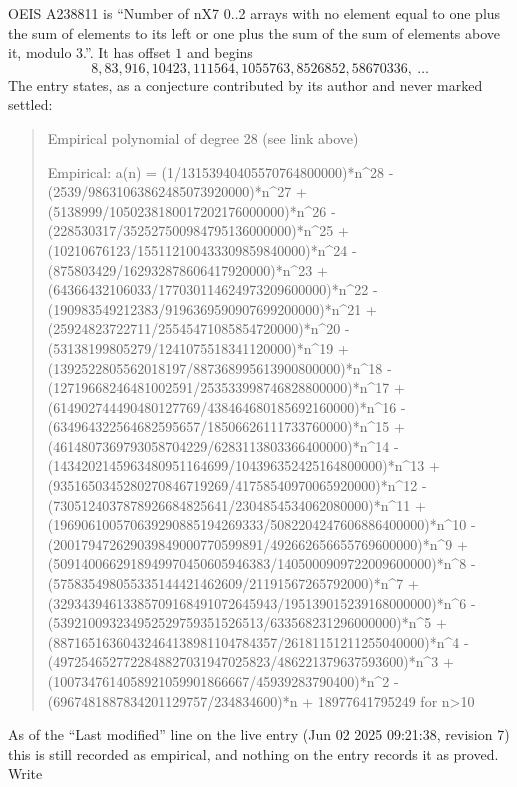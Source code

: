 \documentclass[11pt,a4paper]{article}
\theoremstyle{plain}
\theoremstyle{definition}
\begin{document}
OEIS A238811 is ``Number of nX7 0..2 arrays with no element equal to one plus the sum of elements to its left or one plus the sum of the sum of elements above it, modulo 3.''. It has offset $1$ and begins
\[
8, 83, 916, 10423, 111564, 1055763, 8526852, 58670336,\ \dots
\]
The entry states, as a conjecture contributed by its author and never marked settled:
\begin{quote}
Empirical polynomial of degree 28 (see link above)

Empirical: a(n) = (1/13153940405570764800000)*n\^{}28 - (2539/98631063862485073920000)*n\^{}27 + (5138999/1050238180017202176000000)*n\^{}26 - (228530317/352527500984795136000000)*n\^{}25 + (10210676123/155112100433309859840000)*n\^{}24 - (875803429/162932878606417920000)*n\^{}23 + (64366432106033/177030114624973209600000)*n\^{}22 - (190983549212383/9196369590907699200000)*n\^{}21 + (25924823722711/25545471085854720000)*n\^{}20 - (53138199805279/1241075518341120000)*n\^{}19 + (1392522805562018197/887368995613900800000)*n\^{}18 - (12719668246481002591/253533998746828800000)*n\^{}17 + (614902744490480127769/438464680185692160000)*n\^{}16 - (634964322564682595657/18506626111733760000)*n\^{}15 + (4614807369793058704229/6283113803366400000)*n\^{}14 - (1434202145963480951164699/104396352425164800000)*n\^{}13 + (9351650345280270846719269/41758540970065920000)*n\^{}12 - (7305124037878926684825641/2304854534062080000)*n\^{}11 + (196906100570639290885194269333/5082204247606886400000)*n\^{}10 - (200179472629039849000770599891/492662656655769600000)*n\^{}9 + (5091400662918949970450605946383/1405000909722009600000)*n\^{}8 - (575835498055335144421462609/21191567265792000)*n\^{}7 + (32934394613385709168491072645943/195139015239168000000)*n\^{}6 - (539210093234952529759351526513/633568231296000000)*n\^{}5 + (88716516360432464138981104784357/26181151211255040000)*n\^{}4 - (4972546527722848827031947025823/486221379637593600)*n\^{}3 + (1007347614058921059901866667/45939283790400)*n\^{}2 - (6967481887834201129757/234834600)*n + 18977641795249 for n>10
\end{quote}
As of the ``Last modified'' line on the live entry (Jun 02 2025 09:21:38, revision 7) this is still
recorded as empirical, and nothing on the entry records it as proved. Write
\end{document}
